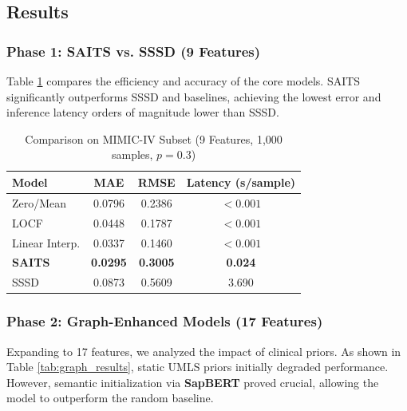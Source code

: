 \subsection{Results}

\subsubsection{Phase 1: SAITS vs. SSSD (9 Features)}
Table \ref{tab:results_9feat} compares the efficiency and accuracy of the core models. SAITS significantly outperforms SSSD and baselines, achieving the lowest error and inference latency orders of magnitude lower than SSSD.

\begin{table}[h]
\centering
\caption{Comparison on MIMIC-IV Subset (9 Features, 1,000 samples, $p=0.3$)}
\label{tab:results_9feat}
\begin{tabular}{@{}lccc@{}}
\toprule
\textbf{Model} & \textbf{MAE} & \textbf{RMSE} & \textbf{Latency (s/sample)} \\ \midrule
Zero/Mean       & 0.0796       & 0.2386        & $<0.001$                   \\
LOCF            & 0.0448       & 0.1787        & $<0.001$                   \\
Linear Interp.  & 0.0337       & 0.1460        & $<0.001$                   \\ \midrule
\textbf{SAITS}  & \textbf{0.0295} & \textbf{0.3005} & \textbf{0.024}            \\
SSSD            & 0.0873       & 0.5609        & 3.690                      \\ \bottomrule
\end{tabular}
\end{table}

\subsubsection{Phase 2: Graph-Enhanced Models (17 Features)}
Expanding to 17 features, we analyzed the impact of clinical priors. As shown in Table \ref{tab:graph_results}, static UMLS priors initially degraded performance. However, semantic initialization via \textbf{SapBERT} proved crucial, allowing the model to outperform the random baseline.

